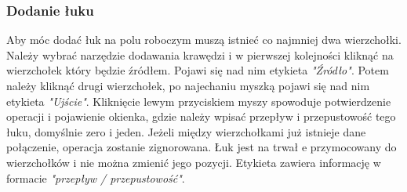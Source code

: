\subsubsection{Dodanie łuku}
Aby móc dodać łuk na polu roboczym muszą istnieć co najmniej dwa wierzchołki. Należy wybrać narzędzie dodawania krawędzi i w pierwszej kolejności kliknąć na wierzchołek który będzie źródłem. Pojawi się nad nim etykieta \textit{"Źródło"}. Potem należy kliknąć drugi wierzchołek, po najechaniu myszką pojawi się nad nim etykieta \textit{"Ujście"}. Kliknięcie lewym przyciskiem myszy spowoduje potwierdzenie operacji i pojawienie okienka, gdzie należy wpisać przepływ i przepustowość tego łuku, domyślnie zero i jeden. Jeżeli między wierzchołkami już istnieje dane połączenie, operacja zostanie zignorowana. Łuk jest na trwał e przymocowany do wierzchołków i nie można zmienić jego pozycji. Etykieta zawiera informację w formacie \emph{"przepływ / przepustowość"}.
